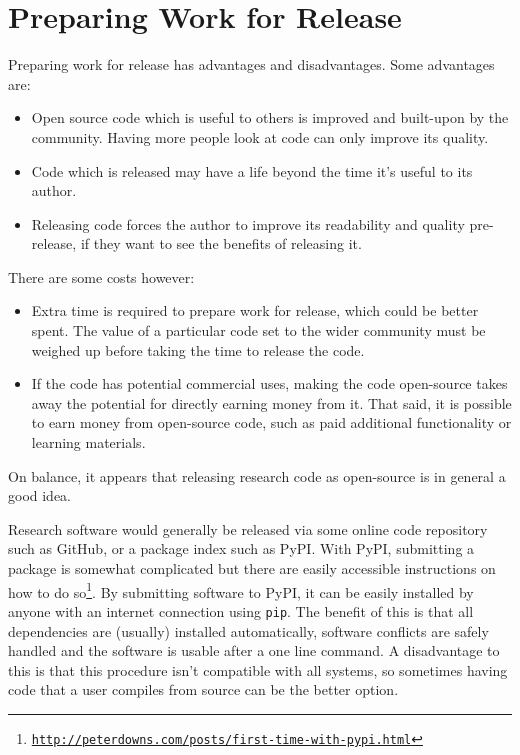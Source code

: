 \documentclass{article}
\begin{document}
\section*{Preparing Work for Release}
Preparing work for release has advantages and disadvantages. Some advantages are:
\begin{itemize}
    \item Open source code which is useful to others is improved and built-upon by the community. Having more people look at code can only improve its quality.
    \item Code which is released may have a life beyond the time it's useful to its author.
    \item Releasing code forces the author to improve its readability and quality pre-release, if they want to see the benefits of releasing it.
\end{itemize}
There are some costs however:
\begin{itemize}
    \item Extra time is required to prepare work for release, which could be better spent. The value of a particular code set to the wider community must be weighed up before taking the time to release the code.
    \item If the code has potential commercial uses, making the code open-source takes away the potential for directly earning money from it. That said, it is possible to earn money from open-source code, such as paid additional functionality or learning materials.
\end{itemize}
On balance, it appears that releasing research code as open-source is in general a good idea.
\par
Research software would generally be released via some online code repository such as GitHub, or a package index such as PyPI. With PyPI, submitting a package is somewhat complicated but there are easily accessible instructions on how to do so\footnote{\href{http://peterdowns.com/posts/first-time-with-pypi.html}{\texttt{http://peterdowns.com/posts/first-time-with-pypi.html}}}. By submitting software to PyPI, it can be easily installed by anyone with an internet connection using \texttt{pip}. The benefit of this is that all dependencies are (usually) installed automatically, software conflicts are safely handled and the software is usable after a one line command. A disadvantage to this is that this procedure isn't compatible with all systems, so sometimes having code that a user compiles from source can be the better option.
\end{document}
